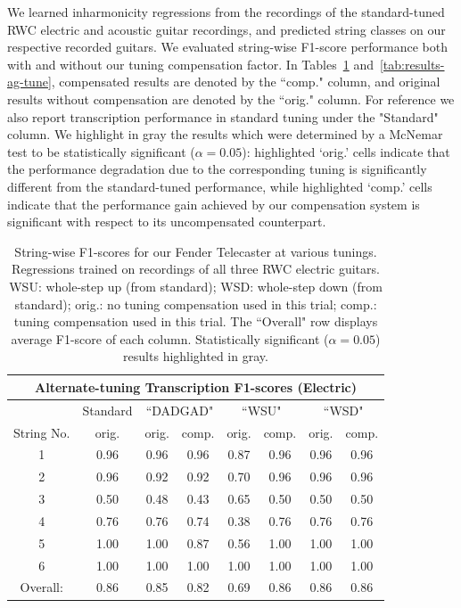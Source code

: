 \documentclass[convention,peer-reviewed]{aesconf}
\begin{document}
We learned inharmonicity regressions from the recordings of the standard-tuned RWC electric and acoustic guitar recordings, and predicted string classes on our respective recorded guitars. We evaluated string-wise F1-score performance both with and without our tuning compensation factor. In Tables~\ref{tab:resultsTune} and~\ref{tab:results-ag-tune}, compensated results are denoted by the ``comp." column, and original results without compensation are denoted by the ``orig." column.  For reference we also report transcription performance in standard tuning under the "Standard" column. We highlight in gray the results which were determined by a McNemar test to be statistically significant ($\alpha = 0.05$): highlighted `orig.' cells indicate that the performance degradation due to the corresponding tuning is significantly different from the standard-tuned performance, while highlighted `comp.' cells indicate that the performance gain achieved by our compensation system is significant with respect to its uncompensated counterpart.

\begin{table}[!htbp]
\begin{center}
\begin{tabular}{||c||c||c|c||c|c||c|c||}
\hline
\multicolumn{8}{|c|}{\bf{Alternate-tuning Transcription F1-scores (Electric)}} \\
\hline
& Standard & \multicolumn{2}{|c|}{``DADGAD"} & \multicolumn{2}{|c|}{``WSU"} & \multicolumn{2}{|c|}{``WSD"} \\
\hline
String No. & orig. & orig. & comp. & orig. & comp. & orig. & comp. \\
\hline
1 & 0.96 & 0.96 & 0.96 & 0.87 & 0.96 & 0.96 & 0.96 \\
\hline
2 & 0.96 & 0.92 & 0.92 & 0.70 & 0.96 & 0.96 & 0.96\\
\hline
3 & 0.50 & 0.48 & 0.43 & 0.65 & 0.50 & 0.50 & 0.50\\
\hline
4 & 0.76 & 0.76 & 0.74 & 0.38 & 0.76 & 0.76 & 0.76 \\
\hline
5 & 1.00 & 1.00 & 0.87 & 0.56 & 1.00 & 1.00 & 1.00 \\
\hline
6 & 1.00 & 1.00 & 1.00 & 1.00 & 1.00 & 1.00 & 1.00\\ 
\hline
\hline
Overall: & 0.86 & 0.85 & 0.82 &  \cellcolor[gray]{0.8}0.69 & \cellcolor[gray]{0.8}0.86 & 0.86 & 0.86\\
\hline
\end{tabular}
\caption{String-wise F1-scores for our Fender Telecaster at various tunings. Regressions trained on recordings of all three RWC electric guitars. WSU: whole-step up (from standard); WSD: whole-step down (from standard); orig.: no tuning compensation used in this trial; comp.: tuning compensation used in this trial. The ``Overall" row displays average F1-score of each column. Statistically significant ($\alpha=0.05$) results highlighted in gray.} 
\label{tab:resultsTune}
\end{center}
\end{table}
\end{document}
